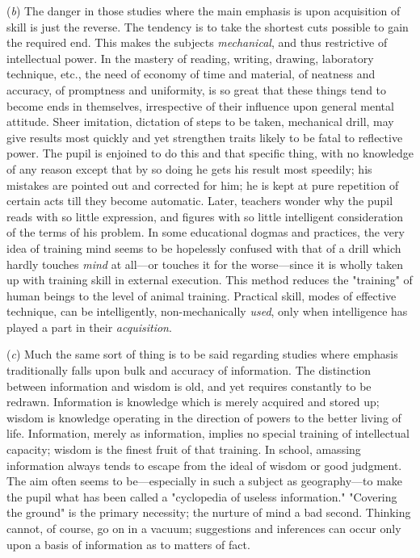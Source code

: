 \documentclass[showtrims,ustradepaper]{memoir}
\begin{document}


(\emph{b}) The danger in those studies where the main emphasis is upon
acquisition of skill is just the reverse. The tendency is to take the
shortest cuts possible to gain the required end. This makes the subjects
\emph{mechanical}, and thus restrictive of intellectual power. In the
mastery of reading, writing, drawing, laboratory technique, etc., the
need of economy of time and material, of neatness and accuracy, of
promptness and uniformity, is so great that these things tend to become
ends in themselves, irrespective of their influence upon general mental
attitude. Sheer imitation, dictation of steps to be taken, mechanical
drill, may give results most quickly and yet strengthen traits likely to
be fatal to reflective power. The pupil is enjoined to do this and that
specific thing, with no knowledge of any reason except that by so doing
he gets his result most speedily; his mistakes are pointed out and
corrected for him; he is kept at pure repetition of certain acts till
they become automatic. Later, teachers wonder why the pupil reads with
so little expression, and figures with so little intelligent
consideration of the
terms
of his problem. In some educational dogmas and practices, the very idea
of training mind seems to be hopelessly confused with that of a drill
which hardly touches \emph{mind} at all---or touches it for the
worse---since it is wholly taken up with training skill in external
execution. This method reduces the "training" of human beings to the
level of animal training. Practical skill, modes of effective technique,
can be intelligently, non-mechanically \emph{used}, only when
intelligence has played a part in their \emph{acquisition}.


(\emph{c}) Much the same sort of thing is to be said regarding studies
where emphasis traditionally falls upon bulk and accuracy of
information. The distinction between information and wisdom is old, and
yet requires constantly to be redrawn. Information is knowledge which is
merely acquired and stored up; wisdom is knowledge operating in the
direction of powers to the better living of life. Information, merely as
information, implies no special training of intellectual capacity;
wisdom is the finest fruit of that training. In school, amassing
information always tends to escape from the ideal of wisdom or good
judgment. The aim often seems to be---especially in such a subject as
geography---to make the pupil what has been called a "cyclopedia of
useless information." "Covering the ground" is the primary necessity;
the nurture of mind a bad second. Thinking cannot, of course, go on in a
vacuum; suggestions and inferences can occur only upon a basis of
information as to matters of fact.
\end{document}

